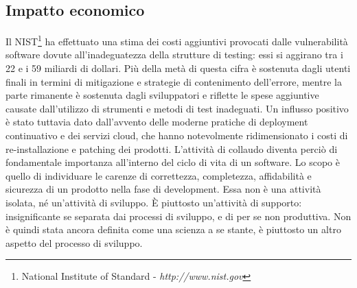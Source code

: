 \subsection{Impatto economico}
Il NIST\footnote{National Institute of Standard - \textit{http://www.nist.gov}} ha effettuato una stima dei costi aggiuntivi provocati dalle vulnerabilità software dovute all'inadeguatezza della strutture di testing: essi si aggirano tra i 22 e i 59 miliardi di dollari. Più della metà di questa cifra è sostenuta dagli utenti finali in termini di mitigazione e strategie di contenimento dell'errore, mentre la parte rimanente è sostenuta dagli sviluppatori e riflette le spese aggiuntive causate dall'utilizzo di strumenti e metodi di test inadeguati.\cite{NistEconomicImpact} Un influsso positivo è stato tuttavia dato dall'avvento delle moderne pratiche di deployment continuativo e dei servizi cloud, che hanno notevolmente ridimensionato i costi di re-installazione e patching dei prodotti.\newline
L'attività di collaudo diventa perciò di fondamentale importanza all'interno del ciclo di vita di un software. Lo scopo è quello di individuare le carenze di correttezza, completezza, affidabilità e sicurezza di un prodotto nella fase di development.
Essa non è una attività isolata, né un'attività di sviluppo. È piuttosto un'attività di supporto: insignificante se separata dai processi di sviluppo, e di per se non produttiva.\cite{GAST}\newline
Non è quindi stata ancora definita come una scienza a se stante, è piuttosto un altro aspetto del processo di sviluppo.\cite{ArtOfSwTesting}
